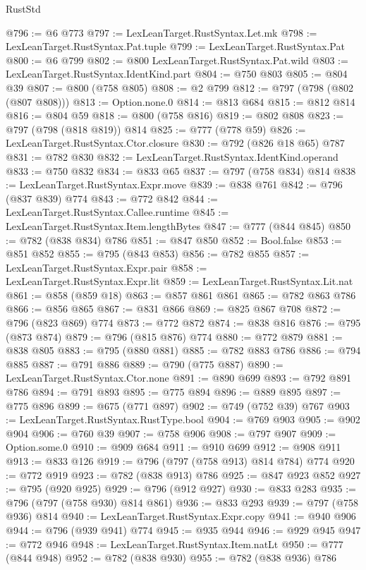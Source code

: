 \begin{lexlean}{RustStd}
\begin{coremodule}
@796 := @6 @773
@797 := LexLeanTarget.RustSyntax.Let.mk
@798 := LexLeanTarget.RustSyntax.Pat.tuple
@799 := LexLeanTarget.RustSyntax.Pat
@800 := @6 @799
@802 := @800 LexLeanTarget.RustSyntax.Pat.wild
@803 := LexLeanTarget.RustSyntax.IdentKind.part
@804 := @750 @803
@805 := @804 @39
@807 := @800 (@758 @805)
@808 := @2 @799
@812 := @797 (@798 (@802 (@807 @808)))
@813 := Option.none.{0}
@814 := @813 @684
@815 := @812 @814
@816 := @804 @59
@818 := @800 (@758 @816)
@819 := @802 @808
@823 := @797 (@798 (@818 @819)) @814
@825 := @777 (@778 @59)
@826 := LexLeanTarget.RustSyntax.Ctor.closure
@830 := @792 (@826 @18 @65) @787
@831 := @782 @830
@832 := LexLeanTarget.RustSyntax.IdentKind.operand
@833 := @750 @832
@834 := @833 @65
@837 := @797 (@758 @834) @814
@838 := LexLeanTarget.RustSyntax.Expr.move
@839 := @838 @761
@842 := @796 (@837 @839) @774
@843 := @772 @842
@844 := LexLeanTarget.RustSyntax.Callee.runtime
@845 := LexLeanTarget.RustSyntax.Item.lengthBytes
@847 := @777 (@844 @845)
@850 := @782 (@838 @834) @786
@851 := @847 @850
@852 := Bool.false
@853 := @851 @852
@855 := @795 (@843 @853)
@856 := @782 @855
@857 := LexLeanTarget.RustSyntax.Expr.pair
@858 := LexLeanTarget.RustSyntax.Expr.lit
@859 := LexLeanTarget.RustSyntax.Lit.nat
@861 := @858 (@859 @18)
@863 := @857 @861 @861
@865 := @782 @863 @786
@866 := @856 @865
@867 := @831 @866
@869 := @825 @867 @708
@872 := @796 (@823 @869) @774
@873 := @772 @872
@874 := @838 @816
@876 := @795 (@873 @874)
@879 := @796 (@815 @876) @774
@880 := @772 @879
@881 := @838 @805
@883 := @795 (@880 @881)
@885 := @782 @883 @786
@886 := @794 @885
@887 := @791 @886
@889 := @790 (@775 @887)
@890 := LexLeanTarget.RustSyntax.Ctor.none
@891 := @890 @699
@893 := @792 @891 @786
@894 := @791 @893
@895 := @775 @894
@896 := @889 @895
@897 := @775 @896
@899 := @675 (@771 @897)
@902 := @749 (@752 @39) @767
@903 := LexLeanTarget.RustSyntax.RustType.bool
@904 := @769 @903
@905 := @902 @904
@906 := @760 @39
@907 := @758 @906
@908 := @797 @907
@909 := Option.some.{0}
@910 := @909 @684
@911 := @910 @699
@912 := @908 @911
@913 := @833 @126
@919 := @796 (@797 (@758 @913) @814 @784) @774
@920 := @772 @919
@923 := @782 (@838 @913) @786
@925 := @847 @923 @852
@927 := @795 (@920 @925)
@929 := @796 (@912 @927)
@930 := @833 @283
@935 := @796 (@797 (@758 @930) @814 @861)
@936 := @833 @293
@939 := @797 (@758 @936) @814
@940 := LexLeanTarget.RustSyntax.Expr.copy
@941 := @940 @906
@944 := @796 (@939 @941) @774
@945 := @935 @944
@946 := @929 @945
@947 := @772 @946
@948 := LexLeanTarget.RustSyntax.Item.natLt
@950 := @777 (@844 @948)
@952 := @782 (@838 @930)
@955 := @782 (@838 @936) @786

\end{coremodule}
\end{lexlean}
